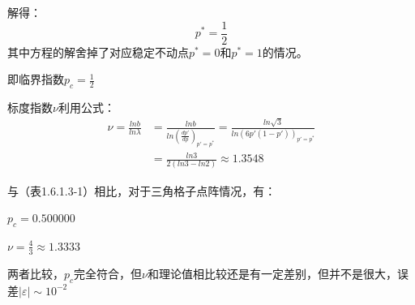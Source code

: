 \documentclass[a4paper,11pt]{article}
\begin{document}
解得：
\begin{equation}
	p^{*} = \frac{1}{2}
\end{equation}
其中方程的解舍掉了对应稳定不动点$p^{*} =0$和$p^{*} =1$的情况。

即临界指数$p_{c} = \frac{1}{2}$

标度指数$\nu$利用公式：
\begin{equation}
\begin{aligned}
	\nu = \frac{lnb}{ln\lambda} &= \frac{lnb}{ln(\frac{dp'}{dp})_{p' = p^{*}}} = \frac{ln\sqrt{3}}{ln(6p'(1-p'))_{p' = p^{*}}} \\
	&= \frac{ln3}{2(ln3-ln2)} \approx 1.3548	
\end{aligned}
\end{equation}

与（表1.6.1.3-1）相比，对于三角格子点阵情况，有：
\begin{description}
\centering
	\item $p_{c} = 0.500000$
	\item $\nu = \frac{4}{3} \approx 1.3333$
\end{description}

两者比较，$p_{c}$完全符合，但$\nu$和理论值相比较还是有一定差别，但并不是很大，误差$|\varepsilon| \sim 10^{-2} $
\end{document}
